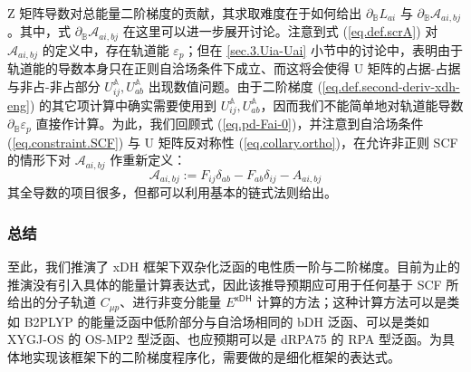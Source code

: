 Z 矩阵导数对总能量二阶梯度的贡献，其求取难度在于如何给出 $\partial_\mathbb{B} L_{ai}$ 与 $\partial_\mathbb{B} \mathscr{A}_{ai, bj}$。其中，式 $\partial_\mathbb{B} \mathscr{A}_{ai, bj}$ 在这里可以进一步展开讨论。注意到式 (\ref{eq.def.scrA}) 对 $\mathscr{A}_{ai, bj}$ 的定义中，存在轨道能 $\varepsilon_p$；但在 \ref{sec.3.Uia-Uai} 小节中的讨论中，表明由于轨道能的导数本身只在正则自洽场条件下成立、而这将会使得 U 矩阵的占据-占据与非占-非占部分 $U_{ij}^\mathbb{A}, U_{ab}^\mathbb{A}$ 出现数值问题。由于二阶梯度 (\ref{eq.def.second-deriv-xdh-eng}) 的其它项计算中确实需要使用到 $U_{ij}^\mathbb{A}, U_{ab}^\mathbb{A}$，因而我们不能简单地对轨道能导数 $\partial_\mathbb{B} \varepsilon_p$ 直接作计算。为此，我们回顾式 (\ref{eq.pd-Fai-0})，并注意到自洽场条件 (\ref{eq.constraint.SCF}) 与 U 矩阵反对称性 (\ref{eq.collary.ortho})，在允许非正则 SCF 的情形下对 $\mathscr{A}_{ai, bj}$ 作重新定义：
\begin{equation}
  \label{eq.def.scrA-noncanonical}
  \mathscr{A}_{ai, bj} := F_{ij} \delta_{ab} - F_{ab} \delta_{ij} - A_{ai, bj}
\end{equation}
其全导数的项目很多，但都可以利用基本的链式法则给出。

\subsubsection{总结}

至此，我们推演了 xDH 框架下双杂化泛函的电性质一阶与二阶梯度。目前为止的推演没有引入具体的能量计算表达式，因此该推导预期应可用于任何基于 SCF 所给出的分子轨道 $C_{\mu p}$、进行非变分能量 $E^\textsf{xDH}$ 计算的方法；这种计算方法可以是类如 B2PLYP 的能量泛函中低阶部分与自洽场相同的 bDH 泛函、可以是类如 XYGJ-OS 的 OS-MP2 型泛函、也应预期可以是 dRPA75 的 RPA 型泛函。为具体地实现该框架下的二阶梯度程序化，需要做的是细化框架的表达式。

